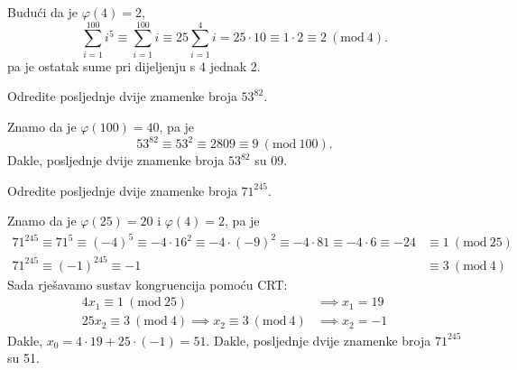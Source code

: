 \documentclass{exam}
\newcommand{\Mod}[1]{\ (\mathrm{mod}\ #1)}
\begin{document}
\begin{questions}
\begin{solution}
  Budući da je $\varphi(4) = 2$,
  \[
    \sum\limits_{i=1}^{100} i^5 \equiv \sum\limits_{i=1}^{100} i \equiv 25 \sum\limits_{i=1}^{4} i = 25 \cdot 10 \equiv 1 \cdot 2 \equiv 2 \Mod{4}.
  \]
  pa je ostatak sume pri dijeljenju s 4 jednak 2.
\end{solution}

\question Odredite posljednje dvije znamenke broja $53^{82}$.

\begin{solution}
  Znamo da je $\varphi(100) = 40$, pa je
  \[
    53^{82} \equiv 53^2 \equiv 2809 \equiv 9 \Mod{100}.
  \]
  Dakle, posljednje dvije znamenke broja $53^{82}$ su 09.
\end{solution}

\question Odredite posljednje dvije znamenke broja $71^{245}$.

\begin{solution}
  Znamo da je $\varphi(25) = 20$ i $\varphi(4) = 2$, pa je
  \begin{align*}
    71^{245} \equiv 71^5 \equiv (-4)^5 \equiv -4 \cdot 16^2 \equiv -4 \cdot (-9)^2 \equiv -4 \cdot 81 \equiv -4 \cdot 6 \equiv -24 &\equiv 1 \Mod{25}\\
    71^{245} \equiv (-1)^{245} \equiv -1 &\equiv 3 \Mod{4}
  \end{align*}
  Sada rješavamo sustav kongruencija pomoću CRT:
  \begin{align*}
    4 x_1 \equiv 1 \Mod{25} &\implies x_1 = 19\\
    25 x_2 \equiv 3 \Mod{4} \implies x_2 \equiv 3 \Mod{4} &\implies x_2 = -1
  \end{align*}
  Dakle, $x_0 = 4 \cdot 19 + 25 \cdot (-1) = 51$. Dakle, posljednje dvije znamenke broja $71^{245}$ su 51.
\end{solution}

\question
{}

\begin{solution}
  \begin{parts}

\end{parts}
\end{solution}
\end{questions}
\end{document}
